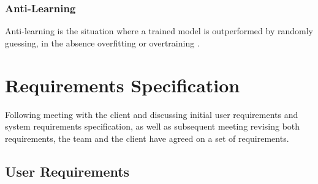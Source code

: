 \documentclass[a4paper,titlepage]{article}
\begin{document}
\subsubsection*{Anti-Learning}
Anti-learning is the situation where a trained model is outperformed by randomly guessing, in the absence overfitting or overtraining \cite{roadknight2015antilearning}.

\section{Requirements Specification}
Following meeting with the client and discussing initial user requirements and system requirements specification, as well as subsequent meeting revising both requirements, the team and the client have agreed on a set of requirements.

\subsection{User Requirements}
\end{document}
